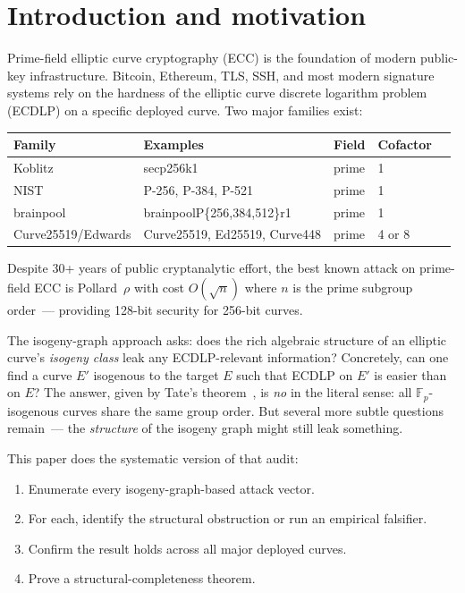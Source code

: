 \documentclass[11pt,a4paper]{article}
\theoremstyle{definition}
\newcommand{\FF}{\mathbb{F}}
\begin{document}
\section{Introduction and motivation}

Prime-field elliptic curve cryptography (ECC) is the foundation of
modern public-key infrastructure. Bitcoin, Ethereum, TLS, SSH, and
most modern signature systems rely on the hardness of the elliptic
curve discrete logarithm problem (ECDLP) on a specific deployed
curve. Two major families exist:

\begin{center}
\begin{tabular}{lllll}
\toprule
Family & Examples & Field & Cofactor \\
\midrule
Koblitz & secp256k1 & prime & 1 \\
NIST & P-256, P-384, P-521 & prime & 1 \\
brainpool & brainpoolP\{256,384,512\}r1 & prime & 1 \\
Curve25519/Edwards & Curve25519, Ed25519, Curve448 & prime & 4 or 8 \\
\bottomrule
\end{tabular}
\end{center}

Despite 30+ years of public cryptanalytic effort, the best known
attack on prime-field ECC is Pollard~$\rho$ with cost $O(\sqrt{n})$
where $n$ is the prime subgroup order~--- providing 128-bit
security for 256-bit curves.

The isogeny-graph approach asks: does the rich algebraic structure
of an elliptic curve's \emph{isogeny class} leak any
ECDLP-relevant information? Concretely, can one find a curve $E'$
isogenous to the target $E$ such that ECDLP on $E'$ is easier than
on $E$? The answer, given by Tate's theorem~\cite{tate1966}, is
\emph{no} in the literal sense: all $\FF_p$-isogenous curves share
the same group order. But several more subtle questions
remain~--- the \emph{structure} of the isogeny graph might still
leak something.

This paper does the systematic version of that audit:

\begin{enumerate}
\item Enumerate every isogeny-graph-based attack vector.
\item For each, identify the structural obstruction or run an
      empirical falsifier.
\item Confirm the result holds across all major deployed curves.
\item Prove a structural-completeness theorem.
\end{enumerate}
\end{document}
